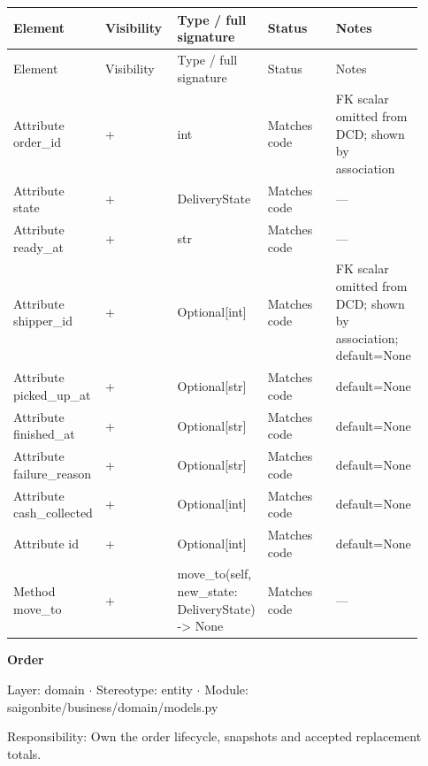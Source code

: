 \begin{longtable}{>{\raggedright\arraybackslash}p{0.1840\linewidth}>{\raggedright\arraybackslash}p{0.1840\linewidth}>{\raggedright\arraybackslash}p{0.1840\linewidth}>{\raggedright\arraybackslash}p{0.1840\linewidth}>{\raggedright\arraybackslash}p{0.1840\linewidth}}
Element & Visibility & Type / full signature & Status & Notes \\
\hline\endfirsthead
Element & Visibility & Type / full signature & Status & Notes \\
\hline\endhead
Attribute order\_id & + & int & Matches code & FK scalar omitted from DCD; shown by association \\
Attribute state & + & DeliveryState & Matches code & --- \\
Attribute ready\_at & + & str & Matches code & --- \\
Attribute shipper\_id & + & Optional[int] & Matches code & FK scalar omitted from DCD; shown by association; default=None \\
Attribute picked\_up\_at & + & Optional[str] & Matches code & default=None \\
Attribute finished\_at & + & Optional[str] & Matches code & default=None \\
Attribute failure\_reason & + & Optional[str] & Matches code & default=None \\
Attribute cash\_collected & + & Optional[int] & Matches code & default=None \\
Attribute id & + & Optional[int] & Matches code & default=None \\
Method move\_to & + & move\_to(self, new\_state: DeliveryState) -\textgreater{} None & Matches code & --- \\
\end{longtable}
\textbf{Order}

Layer: domain \ensuremath{\cdot} Stereotype: \guillemotleft{}entity\guillemotright{} \ensuremath{\cdot} Module: saigonbite/business/domain/models.py

Responsibility: Own the order lifecycle, snapshots and accepted replacement totals.

